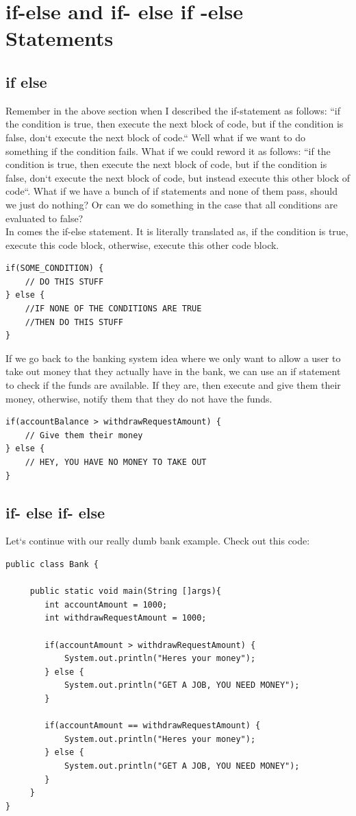 \documentclass[11]{article}
\begin{document}
\section{if-else and if- else if -else Statements}
\subsection{if else}
Remember in the above section when I described the if-statement as follows: ``if the condition is true, then execute the next block of code, but if the condition is false, don`t execute the next block of code.`` Well what if we want to do something if the condition fails. What if we could reword it as follows: ``if the condition is true, then execute the next block of code, but if the condition is false, don`t execute the next block of code, but instead execute this other block of code``. What if we have a bunch of if statements and none of them pass, should we just do nothing? Or can we do something in the case that all conditions are evaluated to false?\\

In comes the if-else statement. It is literally translated as, if the condition is true, execute this code block, otherwise, execute this other code block.

\begin{lstlisting}
if(SOME_CONDITION) {
    // DO THIS STUFF
} else {
    //IF NONE OF THE CONDITIONS ARE TRUE
    //THEN DO THIS STUFF
}
\end{lstlisting}

If we go back to the banking system idea where we only want to allow a user to take out money that they actually have in the bank, we can use an if statement to check if the funds are available. If they are, then execute and give them their money, otherwise, notify them that they do not have the funds.
\begin{lstlisting}
if(accountBalance > withdrawRequestAmount) {
    // Give them their money
} else {
	// HEY, YOU HAVE NO MONEY TO TAKE OUT
}
\end{lstlisting}

\subsection{if- else if- else}
Let`s continue with our really dumb bank example. Check out this code:

\begin{lstlisting}
public class Bank {

     public static void main(String []args){
        int accountAmount = 1000;
        int withdrawRequestAmount = 1000;
        
        if(accountAmount > withdrawRequestAmount) {
            System.out.println("Heres your money");
        } else {
            System.out.println("GET A JOB, YOU NEED MONEY");
        }
        
        if(accountAmount == withdrawRequestAmount) {
            System.out.println("Heres your money");
        } else {
            System.out.println("GET A JOB, YOU NEED MONEY");
        }
     }
}
\end{lstlisting}
\end{document}
